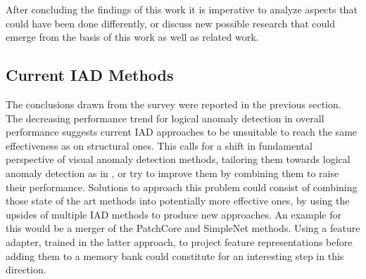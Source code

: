 After concluding the findings of this work it is imperative to analyze aspects that could have been done differently, or discuss new possible research that could emerge from 
the basis of this work as well as related work.\newline

\subsection{Current IAD Methods}
The conclusions drawn from the survey were reported in the previous section. The decreasing performance trend for logical anomaly detection in overall performance suggests 
current IAD approaches to be unsuitable to reach the same effectiveness as on structural ones. This calls for a shift in fundamental perspective of visual anomaly 
detection methods, tailoring them towards logical anomaly detection as in \cite{LOCODentsAndScratchesBergmann2022}, or try to improve them by combining them to raise their performance. Solutions to approach this problem could consist of combining 
those state of the art methods into potentially more effective ones, by using the upsides of multiple IAD methods to produce new approaches. An example for this would be a 
merger of the PatchCore \cite{patchCore2022} and SimpleNet \cite{liu2023simplenet} methods. Using a feature adapter, trained in the latter approach, to project feature 
representations before adding them to a memory bank could constitute for an interesting step in this direction. 

